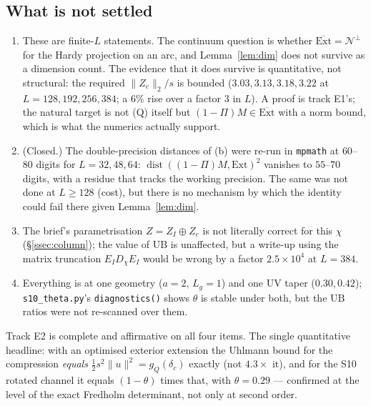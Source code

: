 \documentclass[11pt]{article}
\begin{document}
\subsection{What is not settled}
\begin{enumerate}[leftmargin=1.8em,itemsep=2pt]
\item These are finite-$L$ statements.  The continuum question is whether
 $\overline{\mathrm{Ext}}=\mathcal N^\perp$ for the Hardy projection on an arc, and
 Lemma~\ref{lem:dim} does not survive as a dimension count.  The evidence that it does
 survive is quantitative, not structural: the required $\|Z_e\|_2/s$ is bounded
 ($3.03,3.13,3.18,3.22$ at $L=128,192,256,384$; a $6\%$ rise over a factor $3$ in $L$).
 A proof is track E1's; the natural target is not (Q) itself but
 $(1-\Pi)M\in\overline{\mathrm{Ext}}$ with a norm bound, which is what the numerics
 actually support.
\item[$\checkmark$] (Closed.)  The double-precision distances of (b) were re-run in
 \texttt{mpmath} at $60$--$80$ digits for $L=32,48,64$: $\operatorname{dist}((1-\Pi)M,\mathrm{Ext})^2$
 vanishes to $55$--$70$ digits, with a residue that tracks the working precision.  The
 same was not done at $L\ge128$ (cost), but there is no mechanism by which the identity
 could fail there given Lemma~\ref{lem:dim}.
\item The brief's parametrisation $Z=Z_I\oplus Z_e$ is not literally correct for this
 $\chi$ (\S\ref{ssec:column}); the value of $\mathrm{UB}$ is unaffected, but a write-up
 using the matrix truncation $E_ID_\chi E_I$ would be wrong by a factor $2.5\times10^4$
 at $L=384$.
\item Everything is at one geometry ($a=2$, $L_g=1$) and one UV taper ($0.30,0.42$);
 \texttt{s10\_theta.py}'s \texttt{diagnostics()} shows $\theta$ is stable under both, but
 the $\mathrm{UB}$ ratios were not re-scanned over them.
\end{enumerate}

\begin{verdictok}
Track E2 is complete and affirmative on all four items.  The single quantitative headline:
with an optimised exterior extension the Uhlmann bound for the compression \emph{equals}
$\frac12 s^2\|u\|^2=g_Q(\delta_c)$ exactly (not $4.3\times$ it), and for the S10 rotated
channel it equals $(1-\theta)$ times that, with $\theta=0.29$ --- confirmed at the level of
the exact Fredholm determinant, not only at second order.
\end{verdictok}
\end{document}
